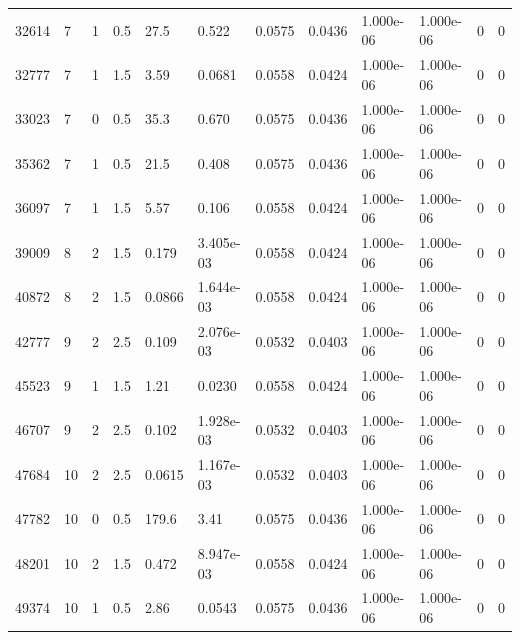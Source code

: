 \documentclass[preview]{standalone}
\begin{document}
{{\begin{tabular}{L{1.2cm}C{1.2cm} C{0.3cm}C{0.5cm} C{1.4cm}C{1.4cm} C{1.4cm}C{1.4cm} C{1.6cm}C{1.6cm} C{1.6cm}C{1.6cm}}
  32614  &     7  & 1     & 0.5 &  27.5  & 0.522  &  0.0575&   0.0436& 1.000e-06 & 1.000e-06   &  0 & 0  \\ 
  32777  &     7  & 1     & 1.5 &  3.59  & 0.0681  &  0.0558&   0.0424& 1.000e-06 & 1.000e-06   &  0 & 0  \\ 
  33023  &     7  & 0     & 0.5 &  35.3  & 0.670  &  0.0575&   0.0436& 1.000e-06 & 1.000e-06   &  0 & 0  \\ 
  35362  &     7  & 1     & 0.5 &  21.5  & 0.408  &  0.0575&   0.0436& 1.000e-06 & 1.000e-06   &  0 & 0  \\ 
  36097  &     7  & 1     & 1.5 &  5.57  & 0.106  &  0.0558&   0.0424& 1.000e-06 & 1.000e-06   &  0 & 0  \\ 
  39009  &     8  & 2     & 1.5 &  0.179  & 3.405e-03  &  0.0558&   0.0424& 1.000e-06 & 1.000e-06   &  0 & 0  \\ 
  40872  &     8  & 2     & 1.5 &  0.0866  & 1.644e-03  &  0.0558&   0.0424& 1.000e-06 & 1.000e-06   &  0 & 0  \\ 
  42777  &     9  & 2     & 2.5 &  0.109  & 2.076e-03  &  0.0532&   0.0403& 1.000e-06 & 1.000e-06   &  0 & 0  \\ 
  45523  &     9  & 1     & 1.5 &  1.21  & 0.0230  &  0.0558&   0.0424& 1.000e-06 & 1.000e-06   &  0 & 0  \\ 
  46707  &     9  & 2     & 2.5 &  0.102  & 1.928e-03  &  0.0532&   0.0403& 1.000e-06 & 1.000e-06   &  0 & 0  \\ 
  47684  &    10  & 2     & 2.5 &  0.0615  & 1.167e-03  &  0.0532&   0.0403& 1.000e-06 & 1.000e-06   &  0 & 0  \\ 
  47782  &    10  & 0     & 0.5 &  179.6  & 3.41  &  0.0575&   0.0436& 1.000e-06 & 1.000e-06   &  0 & 0  \\ 
  48201  &    10  & 2     & 1.5 &  0.472  & 8.947e-03  &  0.0558&   0.0424& 1.000e-06 & 1.000e-06   &  0 & 0  \\ 
  49374  &    10  & 1     & 0.5 &  2.86  & 0.0543  &  0.0575&   0.0436& 1.000e-06 & 1.000e-06   &  0 & 0  \\ 
\hline 
\end{tabular} 

}}
\end{document}
